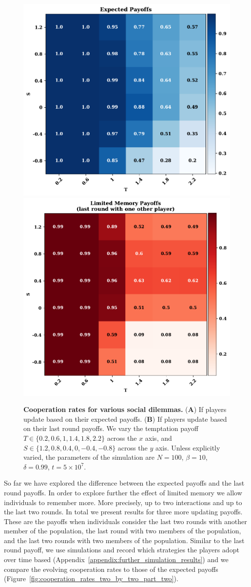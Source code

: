 \documentclass[11pt]{article}
\theoremstyle{plainCl1}
\theoremstyle{plainCl2}
\begin{document}
\begin{figure}[!htbp]
  \centering
  \includegraphics[width=.4\textwidth]{static/expected_two_by_two_games_cooperation.pdf}
  \includegraphics[width=.4\textwidth]{static/stochastic_two_by_two_games_cooperation.pdf}
  \caption{\textbf{Cooperation rates for various social dilemmas.} ({\bf A}) If
  players update based on their expected payoffs. ({\bf B}) If
  players update based on their last round payoffs. We vary the temptation
  payoff \(T \in \{0.2, 0.6, 1, 1.4, 1.8, 2.2\}\)
  across the \(x\) axis, and \(S \in \{1.2, 0.8, 0.4, 0, -0.4, -0.8\}\)
  across the \(y\) axis. Unless explicitly varied, the parameters of the simulation
  are $N\!=\!100$, $\beta\!=\!10$, $\delta\!=\!0.99$, $t\!=\!5\times 10^7$.}\label{fig:cooperation_rates_two_by_two_part_one}
\end{figure}

So far we have explored the difference between the expected payoffs and the last
round payoffs. In order to explore further the effect of limited memory we allow
individuals to remember more. More precisely, up to two interactions and up to
the last two rounds. In total we present results for three more updating
payoffs. These are the payoffs when individuals consider the last two rounds
with another member of the population, the last round with two members of the
population, and the last two rounds with two members of the population.
Similar to the last round payoff, we use simulations and record which strategies
the players adopt over time based
(Appendix~\ref{appendix:further_simulation_results}) and we compare the
evolving cooperation rates to those of the expected payoffs
(Figure~\ref{fig:cooperation_rates_two_by_two_part_two}).
\end{document}
